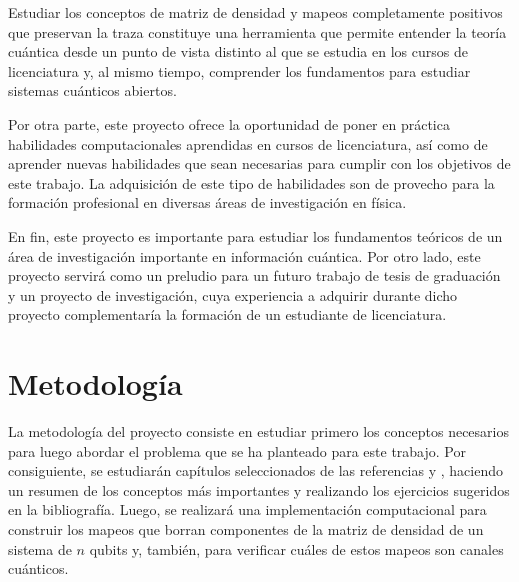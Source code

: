 \documentclass[11pt, spanish, letterpage]{article} %
\newcounter{problem}[section]
\begin{document}
Estudiar los conceptos de matriz de densidad y mapeos completamente
positivos que preservan la traza constituye una herramienta que permite 
entender la teoría cuántica desde un punto de vista distinto al que se estudia
en los cursos de licenciatura y, al mismo tiempo, comprender los fundamentos 
para estudiar sistemas cuánticos abiertos. 

Por otra parte, este proyecto ofrece la oportunidad de poner en práctica habilidades
computacionales aprendidas en cursos de licenciatura, así como de 
aprender nuevas habilidades que sean necesarias para cumplir con los objetivos
de este trabajo. La adquisición de este tipo de habilidades son de provecho para la formación 
profesional en diversas áreas de investigación en física. 

En fin, este proyecto es importante para estudiar los fundamentos teóricos
de un área de investigación importante en información cuántica. 
Por otro lado, este proyecto servirá como un preludio para un futuro trabajo de
tesis de graduación y un proyecto de investigación, cuya experiencia a adquirir durante
dicho proyecto complementaría la formación de un estudiante de licenciatura.  

\section{Metodología}%
La metodología del proyecto consiste en estudiar primero los conceptos 
necesarios para luego abordar el problema que se ha planteado para este
trabajo. Por consiguiente, se estudiarán capítulos seleccionados de
las referencias \cite{bengtsson_zyczkowski_2017} y \cite{nielsen_chuang_2011},
haciendo un resumen de los conceptos más importantes y realizando los
ejercicios sugeridos en la bibliografía. Luego, se realizará una 
implementación computacional para construir los mapeos que borran componentes
de la matriz de densidad de un sistema de $n$ qubits y, también, para
verificar cuáles de estos mapeos son canales cuánticos. 

\newpage
\end{document}

